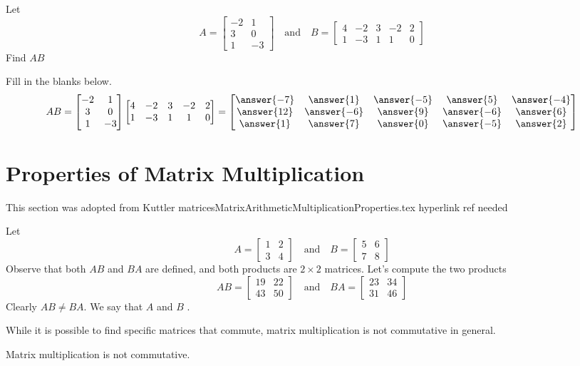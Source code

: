 \documentclass{ximera}
\begin{document}
\begin{example} Let
$$A=\begin{bmatrix}-2 & 1\\3 & 0\\1 & -3\end{bmatrix}\quad\text{and}\quad B=\begin{bmatrix}4 & -2 & 3 & -2 &2\\1 & -3 & 1 & 1 &0\end{bmatrix}$$
Find $AB$
\begin{explanation}
Fill in the blanks below.  
$$AB=\begin{bmatrix}-2 & 1\\3 & 0\\1 & -3\end{bmatrix}\begin{bmatrix}4 & -2 & 3 & -2 &2\\1 & -3 & 1 & 1 &0\end{bmatrix}=\begin{bmatrix}\answer{-7} &\answer{1} & \answer{-5} & \answer{5} & \answer{-4}\\\answer{12} & \answer{-6} & \answer{9} & \answer{-6} & \answer{6}\\\answer{1} & \answer{7} & \answer{0} & \answer{-5} & \answer{2}\end{bmatrix}$$

\end{explanation}
\end{example}

\section*{Properties of Matrix Multiplication}
{\color{red} This section was adopted from Kuttler matricesMatrixArithmeticMultiplicationProperties.tex hyperlink ref needed}
\begin{initprob}Let $$A=\begin{bmatrix}1&2\\3&4\end{bmatrix}\quad\text{and}\quad B=\begin{bmatrix}5&6\\7&8\end{bmatrix}$$
Observe that both $AB$ and $BA$ are defined, and both products are $2\times 2$ matrices.  Let's compute the two products
$$AB=\begin{bmatrix}19&22\\43&50\end{bmatrix}\quad\text{and}\quad BA=\begin{bmatrix}23&34\\31&46\end{bmatrix}$$
Clearly $AB\neq BA$. We say that $A$ and $B$ .
\end{initprob}
While it is possible to find specific matrices that commute, matrix multiplication is not commutative in general.
\begin{warning}Matrix multiplication is not commutative.
\end{warning}
\end{document}
